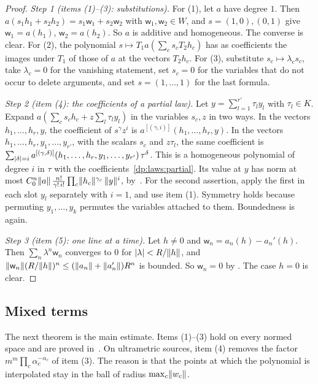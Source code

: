 \begin{proof}
\emph{Step 1 (items (1)--(3): substitutions).} For (1), let $a$ have degree $1$. Then $a(s_1h_1+s_2h_2)=s_1\mathsf w_1+s_2\mathsf w_2$ with $\mathsf w_1,\mathsf w_2\in W$, and $s=(1,0),(0,1)$ give $\mathsf w_1=a(h_1)$, $\mathsf w_2=a(h_2)$. So $a$ is additive and homogeneous. The converse is clear. For (2), the polynomial $s\mapsto T_1a(\sum_cs_cT_2h_c)$ has as coefficients the images under $T_1$ of those of $a$ at the vectors $T_2h_c$. For (3), substitute $s_c\mapsto\lambda_cs_c$, take $\lambda_c=0$ for the vanishing statement, set $s_c=0$ for the variables that do not occur to delete arguments, and set $s=(1,\dots,1)$ for the last formula.

\emph{Step 2 (item (4): the coefficients of a partial law).} Let $y=\sum_{l=1}^{r'}\tau_ly_l$ with $\tau_l\in K$. Expand $a(\sum_cs_ch_c+z\sum_l\tau_ly_l)$ in the variables $s_c,z$ in two ways. In the vectors $h_1,\dots,h_r,y$, the coefficient of $s^\gamma z^i$ is $a^{[(\gamma,i)]}(h_1,\dots,h_r,y)$. In the vectors $h_1,\dots,h_r,y_1,\dots,y_{r'}$, with the scalars $s_c$ and $z\tau_l$, the same coefficient is $\sum_{\lvert \delta\rvert=i}a^{[(\gamma,\delta)]}(h_1,\dots,h_r,y_1,\dots,y_{r'})\,\tau^\delta$. This is a homogeneous polynomial of degree $i$ in $\tau$ with the coefficients~\eqref{dp:laws:partial}. Its value at $y$ has norm at most $C_0^n\lVert a\rVert\,\frac{n!}{\gamma!\,i!}\prod_c\lVert h_c\rVert^{\gamma_c}\,\lVert y\rVert^i$, by~\cite[(Q.4)]{I}. For the second assertion, apply the first in each slot $y_l$ separately with $i=1$, and use item (1). Symmetry holds because permuting $y_1,\dots,y_k$ permutes the variables attached to them. Boundedness is~\cite[(Q.4)]{I} again.

\emph{Step 3 (item (5): one line at a time).} Let $h\ne0$ and $\mathsf w_n=a_n(h)-a_n'(h)$. Then $\sum_n\lambda^n\mathsf w_n$ converges to $0$ for $\lvert \lambda\rvert<R/\lVert h\rVert$, and $\lVert \mathsf w_n\rVert(R/\lVert h\rVert)^n\le(\lVert a_n\rVert+\lVert a_n'\rVert)R^n$ is bounded. So $\mathsf w_n=0$ by \cite[Lemma~A.1]{I}. The case $h=0$ is clear.
\end{proof}

\subsection{Mixed terms}

The next theorem is the main estimate. Items (1)--(3) hold on every normed space and are proved in~\cite{I}. On ultrametric sources, item (4) removes the factor $m^m\prod_c\alpha_c^{-\alpha_c}$ of item (3). The reason is that the points at which the polynomial is interpolated stay in the ball of radius $\max_c\lVert w_c\rVert$.

